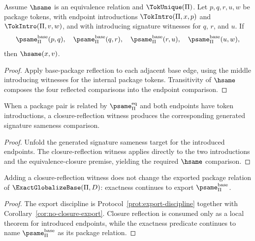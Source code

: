 \begin{corollary}
\label{cor:four-base-edge-reflection}
Assume \(\hsame\) is an equivalence relation and \(\TokUnique(\Pi)\). Let \(p,q,r,u,w\) be package tokens, with endpoint introductions \(\TokIntro(\Pi,x,p)\) and \(\TokIntro(\Pi,v,w)\), and with introducing signature witnesses for \(q\), \(r\), and \(u\). If
$$
\psame_{\Pi}^{\mathrm{base}}(p,q),\quad
\psame_{\Pi}^{\mathrm{base}}(q,r),\quad
\psame_{\Pi}^{\mathrm{base}}(r,u),\quad
\psame_{\Pi}^{\mathrm{base}}(u,w),
$$
then \(\hsame(x,v)\).
\end{corollary}

\begin{proof}
Apply base-package reflection to each adjacent base edge, using the middle introducing witnesses for the internal package tokens. Transitivity of \(\hsame\) composes the four reflected comparisons into the endpoint comparison.
\end{proof}

\begin{corollary}
\label{cor:closure-still-not-active}
When a package pair is related by \(\psame_{\Pi}^{\mathrm{eq}}\) and both endpoints have token introductions, a closure-reflection witness produces the corresponding generated signature sameness comparison.
\end{corollary}

\begin{proof}
Unfold the generated signature sameness target for the introduced endpoints. The closure-reflection witness applies directly to the two introductions and the equivalence-closure premise, yielding the required \(\hsame\) comparison.
\end{proof}

\begin{corollary}
\label{cor:closure-reflection-preserves-base-export}
Adding a closure-reflection witness does not change the exported package relation of \(\ExactGlobalizeBase(\Pi,D)\): exactness continues to export \(\psame_{\Pi}^{\mathrm{base}}\).
\end{corollary}

\begin{proof}
The export discipline is Protocol~\ref{prot:export-discipline} together with Corollary~\ref{cor:no-closure-export}. Closure reflection is consumed only as a local theorem for introduced endpoints, while the exactness predicate continues to name \(\psame_{\Pi}^{\mathrm{base}}\) as its package relation.
\end{proof}

